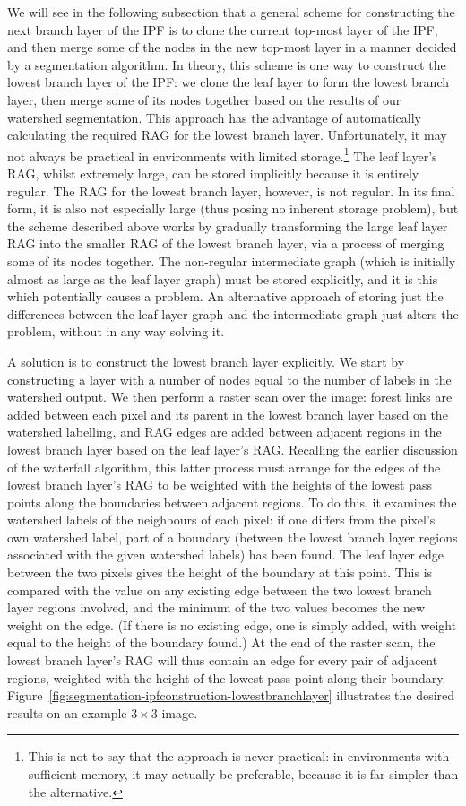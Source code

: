 We will see in the following subsection that a general scheme for constructing the next branch layer of the IPF is to clone the current top-most layer of the IPF, and then merge some of the nodes in the new top-most layer in a manner decided by a segmentation algorithm. In theory, this scheme is one way to construct the lowest branch layer of the IPF: we clone the leaf layer to form the lowest branch layer, then merge some of its nodes together based on the results of our watershed segmentation. This approach has the advantage of automatically calculating the required RAG for the lowest branch layer. Unfortunately, it may not always be practical in environments with limited storage.\footnote{This is not to say that the approach is never practical: in environments with sufficient memory, it may actually be preferable, because it is far simpler than the alternative.} The leaf layer's RAG, whilst extremely large, can be stored implicitly because it is entirely regular. The RAG for the lowest branch layer, however, is not regular. In its final form, it is also not especially large (thus posing no inherent storage problem), but the scheme described above works by gradually transforming the large leaf layer RAG into the smaller RAG of the lowest branch layer, via a process of merging some of its nodes together. The non-regular intermediate graph (which is initially almost as large as the leaf layer graph) must be stored explicitly, and it is this which potentially causes a problem. An alternative approach of storing just the differences between the leaf layer graph and the intermediate graph just alters the problem, without in any way solving it.

A solution is to construct the lowest branch layer explicitly. We start by constructing a layer with a number of nodes equal to the number of labels in the watershed output. We then perform a raster scan over the image: forest links are added between each pixel and its parent in the lowest branch layer based on the watershed labelling, and RAG edges are added between adjacent regions in the lowest branch layer based on the leaf layer's RAG. Recalling the earlier discussion of the waterfall algorithm, this latter process must arrange for the edges of the lowest branch layer's RAG to be weighted with the heights of the lowest pass points along the boundaries between adjacent regions. To do this, it examines the watershed labels of the neighbours of each pixel: if one differs from the pixel's own watershed label, part of a boundary (between the lowest branch layer regions associated with the given watershed labels) has been found. The leaf layer edge between the two pixels gives the height of the boundary at this point. This is compared with the value on any existing edge between the two lowest branch layer regions involved, and the minimum of the two values becomes the new weight on the edge. (If there is no existing edge, one is simply added, with weight equal to the height of the boundary found.) At the end of the raster scan, the lowest branch layer's RAG will thus contain an edge for every pair of adjacent regions, weighted with the height of the lowest pass point along their boundary. Figure~\ref{fig:segmentation-ipfconstruction-lowestbranchlayer} illustrates the desired results on an example $3 \times 3$ image.

